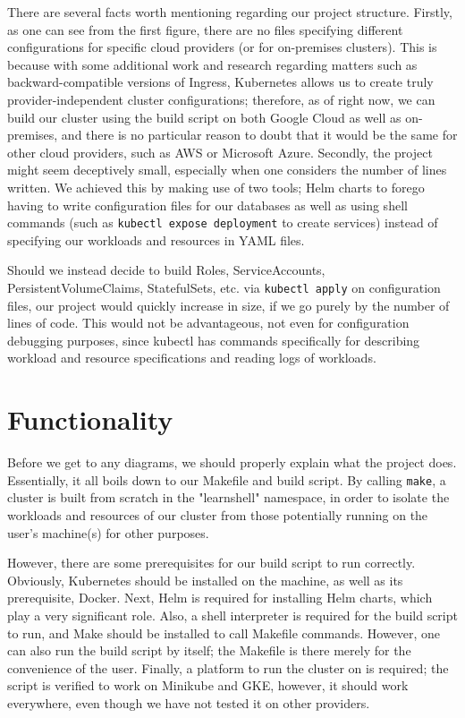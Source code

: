 \documentclass[thesis=B,english]{FITthesis}[2019/12/23]
\begin{document}
There are several facts worth mentioning regarding our project structure. Firstly, as one can see from the first figure, there are no files specifying different configurations for specific cloud providers (or for on-premises clusters). This is because with some additional work and research regarding matters such as backward-compatible versions of Ingress, Kubernetes allows us to create truly provider-independent cluster configurations; therefore, as of right now, we can build our cluster using the build script on both Google Cloud as well as on-premises, and there is no particular reason to doubt that it would be the same for other cloud providers, such as AWS or Microsoft Azure. Secondly, the project might seem deceptively small, especially when one considers the number of lines written. We achieved this by making use of two tools; Helm charts to forego having to write configuration files for our databases as well as using shell commands (such as \verb|kubectl expose deployment| to create services) instead of specifying our workloads and resources in YAML files. 

Should we instead decide to build Roles, ServiceAccounts, PersistentVolumeClaims, StatefulSets, etc. via \verb|kubectl apply| on configuration files, our project would quickly increase in size, if we go purely by the number of lines of code. This would not be advantageous, not even for configuration debugging purposes, since kubectl has commands specifically for describing workload and resource specifications and reading logs of workloads.

\section{Functionality}

Before we get to any diagrams, we should properly explain what the project does. Essentially, it all boils down to our Makefile and build script. By calling \verb|make|, a cluster is built from scratch in the "learnshell" namespace, in order to isolate the workloads and resources of our cluster from those potentially running on the user's machine(s) for other purposes. 

However, there are some prerequisites for our build script to run correctly. Obviously, Kubernetes should be installed on the machine, as well as its prerequisite, Docker. Next, Helm is required for installing Helm charts, which play a very significant role. Also, a shell interpreter is required for the build script to run, and Make should be installed to call Makefile commands. However, one can also run the build script by itself; the Makefile is there merely for the convenience of the user. Finally, a platform to run the cluster on is required; the script is verified to work on Minikube and GKE, however, it should work everywhere, even though we have not tested it on other providers.
\end{document}
